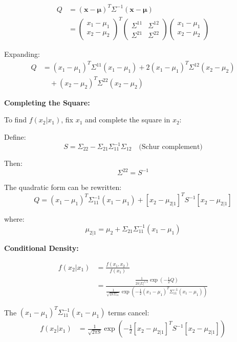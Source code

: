 \documentclass[12pt]{article}
\begin{document}
\begin{explanation}
\begin{align*}
Q &= (\mathbf{x} - \boldsymbol{\mu})^T\Sigma^{-1}(\mathbf{x} - \boldsymbol{\mu}) \\
&= \begin{pmatrix} x_1 - \mu_1 \\ x_2 - \mu_2 \end{pmatrix}^T \begin{pmatrix} \Sigma^{11} & \Sigma^{12} \\ \Sigma^{21} & \Sigma^{22} \end{pmatrix} \begin{pmatrix} x_1 - \mu_1 \\ x_2 - \mu_2 \end{pmatrix}
\end{align*}

Expanding:
\begin{align*}
Q &= (x_1 - \mu_1)^T\Sigma^{11}(x_1 - \mu_1) + 2(x_1 - \mu_1)^T\Sigma^{12}(x_2 - \mu_2) \\
&\quad + (x_2 - \mu_2)^T\Sigma^{22}(x_2 - \mu_2)
\end{align*}

\textbf{Completing the Square:}

To find $f(x_2 | x_1)$, fix $x_1$ and complete the square in $x_2$:

Define:
\[
S = \Sigma_{22} - \Sigma_{21}\Sigma_{11}^{-1}\Sigma_{12} \quad \text{(Schur complement)}
\]

Then:
\[
\Sigma^{22} = S^{-1}
\]

The quadratic form can be rewritten:
\[
Q = (x_1 - \mu_1)^T\Sigma_{11}^{-1}(x_1 - \mu_1) + [x_2 - \mu_{2|1}]^TS^{-1}[x_2 - \mu_{2|1}]
\]

where:
\[
\mu_{2|1} = \mu_2 + \Sigma_{21}\Sigma_{11}^{-1}(x_1 - \mu_1)
\]

\textbf{Conditional Density:}

\begin{align*}
f(x_2 | x_1) &= \frac{f(x_1, x_2)}{f(x_1)} \\
&= \frac{\frac{1}{2\pi|\Sigma|^{1/2}}\exp(-\frac{1}{2}Q)}{\frac{1}{\sqrt{2\pi\Sigma_{11}}}\exp\left(-\frac{1}{2}(x_1-\mu_1)^T\Sigma_{11}^{-1}(x_1-\mu_1)\right)}
\end{align*}

The $(x_1 - \mu_1)^T\Sigma_{11}^{-1}(x_1 - \mu_1)$ terms cancel:
\begin{align*}
f(x_2 | x_1) &= \frac{1}{\sqrt{2\pi S}}\exp\left(-\frac{1}{2}[x_2 - \mu_{2|1}]^TS^{-1}[x_2 - \mu_{2|1}]\right)
\end{align*}


\end{explanation}
\end{document}
